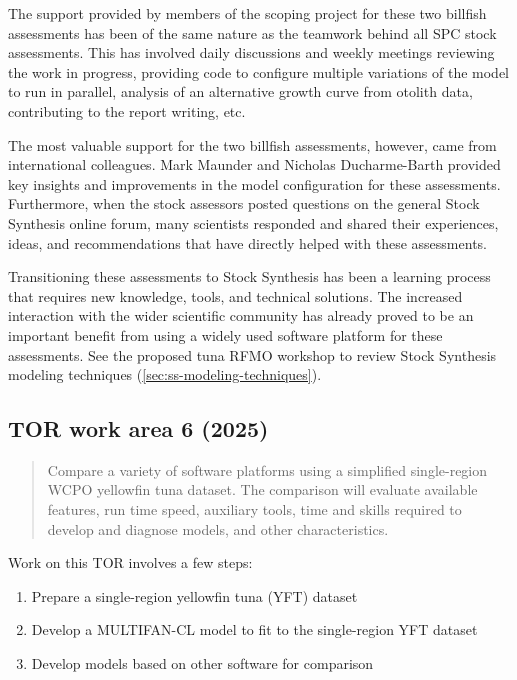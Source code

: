 \documentclass{SCreport}
\begin{document}
The support provided by members of the scoping project for these two billfish
assessments has been of the same nature as the teamwork behind all SPC stock
assessments. This has involved daily discussions and weekly meetings reviewing
the work in progress, providing code to configure multiple variations of the
model to run in parallel, analysis of an alternative growth curve from otolith
data, contributing to the report writing, etc.

The most valuable support for the two billfish assessments, however, came from
international colleagues. Mark Maunder and Nicholas Ducharme-Barth provided key
insights and improvements in the model configuration for these assessments.
Furthermore, when the stock assessors posted questions on the general Stock
Synthesis online forum, many scientists responded and shared their experiences,
ideas, and recommendations that have directly helped with these assessments.

Transitioning these assessments to Stock Synthesis has been a learning process
that requires new knowledge, tools, and technical solutions. The increased
interaction with the wider scientific community has already proved to be an
important benefit from using a widely used software platform for these
assessments. See the proposed tuna RFMO workshop to review Stock Synthesis
modeling techniques (\autoref{sec:ss-modeling-techniques}).

\vspace{2ex}

\hypertarget{link:tor-6}{}
\subsection{TOR work area 6 (2025)}
\label{sec:tor-6}

\begin{quote}\sf
  Compare a variety of software platforms using a simplified single-region WCPO
  yellowfin tuna dataset. The comparison will evaluate available features, run
  time speed, auxiliary tools, time and skills required to develop and diagnose
  models, and other characteristics.
\end{quote}

\vspace{2ex}

Work on this TOR involves a few steps:

\begin{enumerate}
  \item Prepare a single-region yellowfin tuna (YFT) dataset\\[-4.5ex]
  \item Develop a MULTIFAN-CL model to fit to the single-region YFT
  dataset\\[-4.5ex]
  \item Develop models based on other software for comparison
\end{enumerate}
\end{document}
